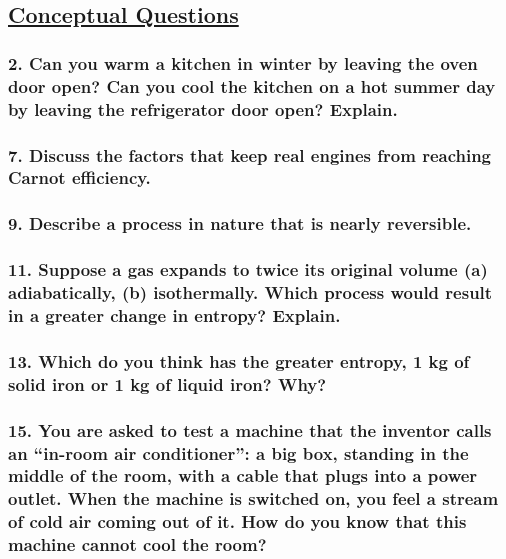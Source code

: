 \documentclass{article}
\title{
    \vspace{2in}
    \textmd{\textbf{\hmwkTitle}}\\
    \vspace{0.5in}
    \textmd{\textbf{\hmwkClass}}\\
    \vspace{4in}
}
\author{\hmwkAuthorName}
\date{}
\begin{document}
\maketitle
\newpage
\begin{center}
    \section*{\textbf{\underline {Conceptual Questions}}}
\end{center}
\subsubsection*{
    2. Can you warm a kitchen in winter by leaving the oven door
    open? Can you cool the kitchen on a hot summer day by
    leaving the refrigerator door open? Explain.
}

\subsubsection*{
    7. Discuss the factors that keep real engines from
    reaching Carnot efficiency.
}
\vspace{2.5in}
\subsubsection*{
    9. Describe a process in nature that is nearly reversible.
}
\newpage
\subsubsection*{
    11. Suppose a gas expands to twice its original volume 
    (\textbf{a}) adiabatically, (\textbf{b}) isothermally. 
    Which process would result in a greater change in entropy? Explain.
}
\vspace{2.5in}
\subsubsection*{
    13. Which do you think has the greater entropy, 
    1 kg of solid iron or 1 kg of liquid iron? Why?
}
\vspace{2in}
\subsubsection*{
    15. You are asked to test a machine that the inventor
    calls an “in-room air conditioner”: a big box, standing 
    in the middle of the room, with a cable that plugs into a
    power outlet. When the machine is switched on, you feel a
    stream of cold air coming out of it. How do you know that this machine cannot cool the room?
}
\newpage
\end{document}
